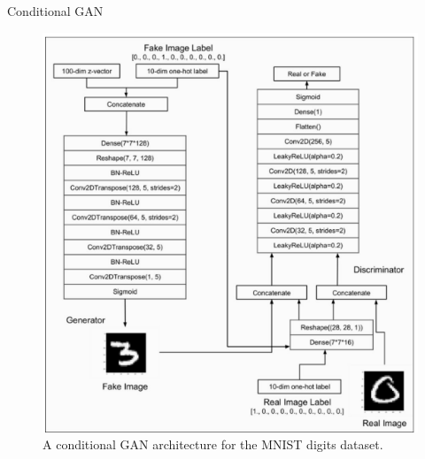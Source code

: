 \begin{frame}[allowframebreaks]{Conditional GAN}
\framebreak
\begin{figure}
    \centering
    \includegraphics[height=0.8\textheight, width=\textwidth, keepaspectratio]{images/gan/cond_gan_2.png}
    \caption{A conditional GAN architecture for the MNIST digits dataset.}
\end{figure}

\end{frame}

